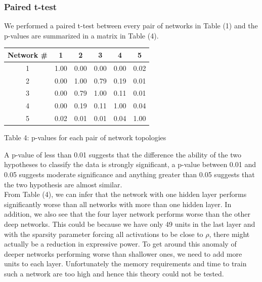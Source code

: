 \documentclass[10pt,twocolumn,letterpaper]{article}
\begin{document}
\subsubsection{Paired t-test}
We performed a paired t-test between every pair of networks in Table (1) and the p-values are summarized in a matrix in Table (4). 
\begin{center}
\begin{tabular}{|c|c|c|c|c|c|}
	\hline
	\textbf{Network \#} & \textbf{1} & \textbf{2} & \textbf{3} & \textbf{4} & \textbf{5} \\ \hline \hline
	1 & 1.00 & 0.00 & 0.00 & 0.00 & 0.02\\ \hline
	2 & 0.00 & 1.00 & 0.79 & 0.19 & 0.01\\ \hline
	3 & 0.00 & 0.79 & 1.00 & 0.11 & 0.01\\ \hline
	4 & 0.00 & 0.19 & 0.11 & 1.00 & 0.04\\ \hline
	5 & 0.02 & 0.01 & 0.01 & 0.04 & 1.00\\ \hline
\end{tabular}
\end{center}
\begin{center}
	Table 4: p-values for each pair of network topologies
\end{center}
A p-value of less than 0.01 suggests that the difference the ability of the two hypotheses to classify the data is strongly significant, a p-value between 0.01 and 0.05 suggests moderate significance and anything greater than 0.05 suggests that the two hypothesis are almost similar.\\

From Table (4), we can infer that the network with one hidden layer performs significantly worse than all networks with more than one hidden layer. In addition, we also see that the four layer network performs worse than the other deep networks. This could be because we have only 49 units in the last layer and with the sparsity parameter forcing all activations to be close to $\rho$, there might actually be a reduction in expressive power. To get around this anomaly of deeper networks performing worse than shallower ones, we need to add more units to each layer. Unfortunately the memory requirements and time to train such a network are too high and hence this theory could not be tested.
\end{document}
